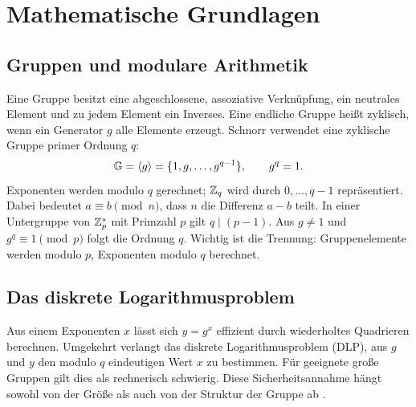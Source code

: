 \section{Mathematische Grundlagen}\label{sec:grundlagen}
\subsection{Gruppen und modulare Arithmetik}
Eine Gruppe besitzt eine abgeschlossene, assoziative Verknüpfung, ein neutrales Element und zu jedem Element ein Inverses. Eine endliche Gruppe heißt zyklisch, wenn ein Generator $g$ alle Elemente erzeugt. Schnorr verwendet eine zyklische Gruppe primer Ordnung $q$:
\[
 \mathbb{G}=\langle g\rangle=\{1,g,\ldots,g^{q-1}\},\qquad g^q=1.
\]
Exponenten werden modulo $q$ gerechnet; $\mathbb{Z}_q$ wird durch $0,\ldots,q-1$ repräsentiert. Dabei bedeutet $a\equiv b\pmod n$, dass $n$ die Differenz $a-b$ teilt. In einer Untergruppe von $\mathbb{Z}_p^*$ mit Primzahl $p$ gilt $q\mid(p-1)$. Aus $g\neq1$ und $g^q\equiv1\pmod p$ folgt die Ordnung $q$. Wichtig ist die Trennung: Gruppenelemente werden modulo $p$, Exponenten modulo $q$ berechnet.

\subsection{Das diskrete Logarithmusproblem}
Aus einem Exponenten $x$ lässt sich $y=g^x$ effizient durch wiederholtes Quadrieren berechnen. Umgekehrt verlangt das diskrete Logarithmusproblem (DLP), aus $g$ und $y$ den modulo $q$ eindeutigen Wert $x$ zu bestimmen. Für geeignete große Gruppen gilt dies als rechnerisch schwierig. Diese Sicherheitsannahme hängt sowohl von der Größe als auch von der Struktur der Gruppe ab \cite{menezes1996,galbraith2012}.
